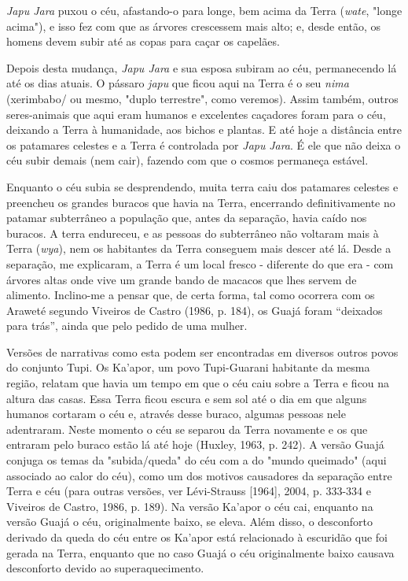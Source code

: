 \emph{Japu Jara} puxou o céu, afastando-o para longe, bem acima da Terra
(\emph{wate}, "longe acima"), e isso fez com que as árvores crescessem
mais alto; e, desde então, os homens devem subir até as copas para caçar
os capelães.

Depois desta mudança, \emph{Japu Jara} e sua esposa subiram ao céu,
permanecendo lá até os dias atuais. O pássaro \emph{japu} que ficou aqui
na Terra é o seu \emph{nima} (xerimbabo/ ou mesmo, "duplo terrestre",
como veremos). Assim também, outros seres-animais que aqui eram humanos
e excelentes caçadores foram para o céu, deixando a Terra à humanidade,
aos bichos e plantas. E até hoje a distância entre os patamares celestes
e a Terra é controlada por \emph{Japu} \emph{Jara}. É ele que não deixa
o céu subir demais (nem cair), fazendo com que o cosmos permaneça
estável.

Enquanto o céu subia se desprendendo, muita terra caiu dos patamares
celestes e preencheu os grandes buracos que havia na Terra, encerrando
definitivamente no patamar subterrâneo a população que, antes da
separação, havia caído nos buracos. A terra endureceu, e as pessoas do
subterrâneo não voltaram mais à Terra (\emph{wya}), nem os habitantes da
Terra conseguem mais descer até lá. Desde a separação, me explicaram, a
Terra é um local fresco - diferente do que era - com árvores altas onde
vive um grande bando de macacos que lhes servem de alimento. Inclino-me
a pensar que, de certa forma, tal como ocorrera com os Araweté segundo
Viveiros de Castro (1986, p. 184), os Guajá foram ``deixados para
trás'', ainda que pelo pedido de uma mulher.

Versões de narrativas como esta podem ser encontradas em diversos outros
povos do conjunto Tupi. Os Ka'apor, um povo Tupi-Guarani habitante da
mesma região, relatam que havia um tempo em que o céu caiu sobre a Terra
e ficou na altura das casas. Essa Terra ficou escura e sem sol até o dia
em que alguns humanos cortaram o céu e, através desse buraco, algumas
pessoas nele adentraram. Neste momento o céu se separou da Terra
novamente e os que entraram pelo buraco estão lá até hoje (Huxley, 1963,
p. 242). A versão Guajá conjuga os temas da "subida/queda" do céu com a
do "mundo queimado" (aqui associado ao calor do céu), como um dos
motivos causadores da separação entre Terra e céu (para outras versões,
ver Lévi-Strauss {[}1964{]}, 2004, p. 333-334 e Viveiros de Castro,
1986, p. 189). Na versão Ka'apor o céu cai, enquanto na versão Guajá o
céu, originalmente baixo, se eleva. Além disso, o desconforto derivado
da queda do céu entre os Ka'apor está relacionado à escuridão que foi
gerada na Terra, enquanto que no caso Guajá o céu originalmente baixo
causava desconforto devido ao superaquecimento.

